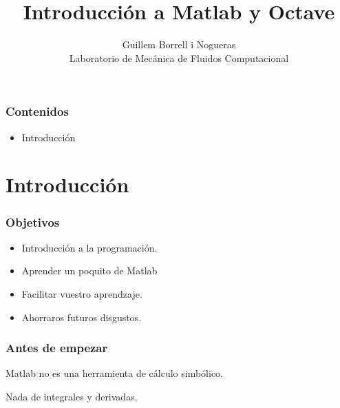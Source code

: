 \documentclass[12pt]{beamer}
\title{Introducción a Matlab y Octave}
\author{Guillem Borrell i Nogueras\\
Laboratorio de Mecánica de Fluidos Computacional}
\begin{document}

\begin{frame}
  \titlepage
\end{frame}

\begin{frame}
  \tableofcontents[pausesections]
\end{frame}




\begin{frame}
\frametitle{Contenidos}
\begin{itemize}
\item Introducción
\end{itemize}
\end{frame}

\section{Introducción}

\begin{frame}
  \frametitle{Objetivos}
  \begin{itemize}
  \item Introducción a la programación.
  \item Aprender un poquito de Matlab
  \item Facilitar vuestro aprendzaje.
  \item Ahorraros futuros disgustos.
  \end{itemize}
\end{frame}

\begin{frame}
  \frametitle{Antes de empezar}
  \begin{Huge}
    \begin{center}
      Matlab no es una herramienta de cálculo simbólico.
    \end{center}
  \end{Huge}
  \pause
  Nada de integrales y derivadas.
\end{frame}
\end{document}
